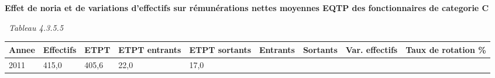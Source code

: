 \textbf{Effet de noria et de variations d'effectifs sur rémunérations
nettes moyennes EQTP des fonctionnaires de categorie C}

~\emph{Tableau 4.3.5.5}

\begin{longtable}[]{@{}lllllllll@{}}
\toprule
\begin{minipage}[b]{0.05\columnwidth}\raggedright
Annee\strut
\end{minipage} & \begin{minipage}[b]{0.08\columnwidth}\raggedright
Effectifs\strut
\end{minipage} & \begin{minipage}[b]{0.05\columnwidth}\raggedright
ETPT\strut
\end{minipage} & \begin{minipage}[b]{0.10\columnwidth}\raggedright
ETPT entrants\strut
\end{minipage} & \begin{minipage}[b]{0.10\columnwidth}\raggedright
ETPT sortants\strut
\end{minipage} & \begin{minipage}[b]{0.07\columnwidth}\raggedright
Entrants\strut
\end{minipage} & \begin{minipage}[b]{0.07\columnwidth}\raggedright
Sortants\strut
\end{minipage} & \begin{minipage}[b]{0.11\columnwidth}\raggedright
Var. effectifs\strut
\end{minipage} & \begin{minipage}[b]{0.14\columnwidth}\raggedright
Taux de rotation \%\strut
\end{minipage}\tabularnewline
\midrule
\endhead
\begin{minipage}[t]{0.05\columnwidth}\raggedright
2011\strut
\end{minipage} & \begin{minipage}[t]{0.08\columnwidth}\raggedright
415,0\strut
\end{minipage} & \begin{minipage}[t]{0.05\columnwidth}\raggedright
405,6\strut
\end{minipage} & \begin{minipage}[t]{0.10\columnwidth}\raggedright
22,0\strut
\end{minipage} & \begin{minipage}[t]{0.10\columnwidth}\raggedright
17,0\strut
\end{minipage} & \begin{minipage}[t]{0.07\columnwidth}\raggedright

\end{minipage}
\end{longtable}
